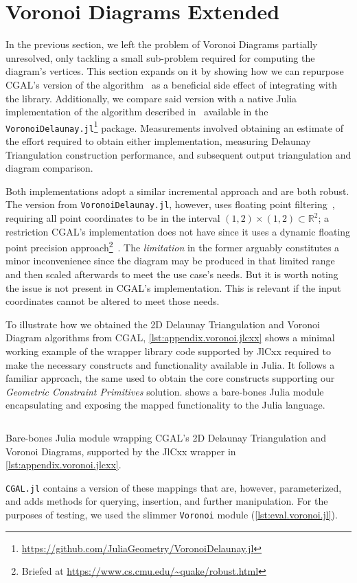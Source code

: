 \section{Voronoi Diagrams Extended}%
\label{sec:eval.voronoi}

In the previous section, we left the problem of Voronoi Diagrams partially
unresolved, only tackling a small sub-problem required for computing the
diagram's vertices.  This section expands on it by showing how we can repurpose
\ac{CGAL}'s version of the algorithm~\cite{CGAL:5.3:VDA2} as a beneficial side
effect of integrating with the library.  Additionally, we compare said version
with a native Julia implementation of the algorithm described
in~\cite{Springel:2010:GCHSMM} available in the
\texttt{VoronoiDelaunay.jl}\footnote{\url{https://github.com/JuliaGeometry/VoronoiDelaunay.jl}}
package.  Measurements involved obtaining an estimate of the effort required to
obtain either implementation, measuring Delaunay Triangulation construction
performance, and subsequent output triangulation and diagram comparison.

Both implementations adopt a similar incremental approach and are both robust.
The version from \texttt{VoronoiDelaunay.jl}, however, uses floating point
filtering~\cite{Springel:2010:GCHSMM}, requiring all point coordinates to be in
the interval $\left(1, 2\right) \times \left(1, 2\right) \subset \mathbb{R}^2$;
a restriction \ac{CGAL}'s implementation does not have since it uses a dynamic
floating point precision approach\footnote{Briefed at
\url{https://www.cs.cmu.edu/~quake/robust.html}}~\cite{Shewchuk:1997:APFPAFRGP}.
The \textit{limitation} in the former arguably constitutes a minor inconvenience
since the diagram may be produced in that limited range and then scaled
afterwards to meet the use case's needs.  But it is worth noting the issue is
not present in \ac{CGAL}'s implementation.  This is relevant if the input
coordinates cannot be altered to meet those needs.

To illustrate how we obtained the 2D Delaunay Triangulation and Voronoi Diagram
algorithms from \ac{CGAL}, \cref{lst:appendix.voronoi.jlcxx} shows a minimal
working example of the wrapper library code supported by JlCxx required to make
the necessary constructs and functionality available in Julia.  It follows a
familiar approach, the same used to obtain the core constructs supporting our
\textit{Geometric Constraint Primitives} solution.  
shows a bare-bones Julia module encapsulating and exposing the mapped
functionality to the Julia language.
\begin{listing}[htb]
  \inputminted{julia}{jl/Voronoi.jl}
  \caption[Bare-bones Julia module wrapping CGAL's Delaunay algorithms]{
    Bare-bones Julia module wrapping \ac{CGAL}'s 2D Delaunay Triangulation and
    Voronoi Diagrams, supported by the JlCxx wrapper in
    \cref{lst:appendix.voronoi.jlcxx}.}%
  \label{lst:eval.voronoi.jl}
\end{listing}
\texttt{CGAL.jl} contains a version of these mappings that are, however,
parameterized, and adds methods for querying, insertion, and further
manipulation.  For the purposes of testing, we used the slimmer \texttt{Voronoi}
module (\cref{lst:eval.voronoi.jl}).

